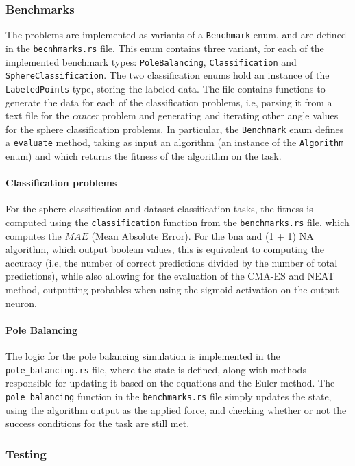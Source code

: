 \subsubsection{Benchmarks}

The problems are implemented as variants of a \texttt{Benchmark} enum, and are defined in the \texttt{becnhmarks.rs} file.
This enum contains three variant, for each of the implemented benchmark types: \texttt{PoleBalancing}, \texttt{Classification} and \texttt{SphereClassification}.
The two classification enums hold an instance of the \texttt{LabeledPoints} type, storing the labeled data. The file contains functions to generate the
data for each of the classification problems, i.e, parsing it from a text file for the \textit{cancer} problem and generating and iterating other
angle values for the sphere classification problems. In particular, the \texttt{Benchmark} enum defines a \texttt{evaluate} method, taking as input an
algorithm (an instance of the \texttt{Algorithm} enum) and which returns the fitness of the algorithm on the task.

\paragraph{Classification problems} For the sphere classification and dataset classification tasks, the fitness is computed using the \texttt{classification}
function from the \texttt{benchmarks.rs} file, which computes the $MAE$ (Mean Absolute Error). For the bna and (1 + 1) NA algorithm, which output boolean
values, this is equivalent to computing the accuracy (i.e, the number of correct predictions divided by the number of total predictions), while also
allowing for the evaluation of the CMA-ES and NEAT method, outputting probables when using the sigmoid activation on the output neuron.

\paragraph{Pole Balancing} The logic for the pole balancing simulation is implemented in the \texttt{pole\_balancing.rs} file, where the state is defined, along with methods
responsible for updating it based on the equations and the Euler method. The \texttt{pole\_balancing} function in the \texttt{benchmarks.rs} file simply
updates the state, using the algorithm output as the applied force, and checking whether or not the success conditions for the task are still met.

\subsubsection{Testing}

